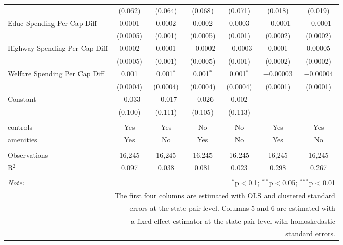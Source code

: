 \begin{table}[!htbp]
\begin{tabular}{@{\extracolsep{5pt}}lcccccc}
  & (0.062) & (0.064) & (0.068) & (0.071) & (0.018) & (0.019) \\ 
  Educ Spending Per Cap Diff & 0.0001 & 0.0002 & 0.0002 & 0.0003 & $-$0.0001 & $-$0.0001 \\ 
  & (0.0005) & (0.001) & (0.0005) & (0.001) & (0.0002) & (0.0002) \\ 
  Highway Spending Per Cap Diff & 0.0002 & 0.0001 & $-$0.0002 & $-$0.0003 & 0.0001 & 0.00005 \\ 
  & (0.0005) & (0.001) & (0.0005) & (0.001) & (0.0002) & (0.0002) \\ 
  Welfare Spending Per Cap Diff & 0.001 & 0.001$^{*}$ & 0.001$^{*}$ & 0.001$^{*}$ & $-$0.00003 & $-$0.00004 \\ 
  & (0.0004) & (0.0004) & (0.0004) & (0.0004) & (0.0001) & (0.0001) \\ 
  Constant & $-$0.033 & $-$0.017 & $-$0.026 & 0.002 &  &  \\ 
  & (0.100) & (0.111) & (0.105) & (0.113) &  &  \\ 
 \hline \\[-1.8ex] 
controls & Yes & Yes & No & No & Yes & Yes \\ 
amenities & Yes & No & Yes & No & Yes & No \\ 
\hline \\[-1.8ex] 
Observations & 16,245 & 16,245 & 16,245 & 16,245 & 16,245 & 16,245 \\ 
R$^{2}$ & 0.097 & 0.038 & 0.081 & 0.023 & 0.298 & 0.267 \\ 
\hline 
\hline \\[-1.8ex] 
\textit{Note:}  & \multicolumn{6}{r}{$^{*}$p$<$0.1; $^{**}$p$<$0.05; $^{***}$p$<$0.01} \\ 
 & \multicolumn{6}{r}{The first four columns are estimated with OLS and clustered standard} \\ 
 & \multicolumn{6}{r}{ errors at the state-pair level. Columns 5 and 6 are estimated with} \\ 
 & \multicolumn{6}{r}{a fixed effect estimator at the state-pair level with homoskedastic} \\ 
 & \multicolumn{6}{r}{standard errors.} \\ 
\end{tabular} 
\end{table} 
